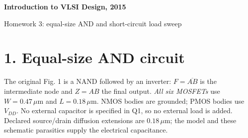 \documentclass[11pt]{article}
\begin{document}
\begin{center}{\Large\bfseries Introduction to VLSI Design, 2015}\par{\large Homework 3: equal-size AND and short-circuit load sweep}\end{center}
\section*{1. Equal-size AND circuit}
The original Fig. 1 is a NAND followed by an inverter: $F=\overline{AB}$ is the intermediate node and $Z=AB$ the final output. \emph{All six MOSFETs} use $W=0.47\,\mu$m and $L=0.18\,\mu$m. NMOS bodies are grounded; PMOS bodies use $V_{DD}$. No external capacitor is specified in Q1, so no external load is added. Declared source/drain diffusion extensions are $0.18\,\mu$m; the model and these schematic parasitics supply the electrical capacitance.
\end{document}
